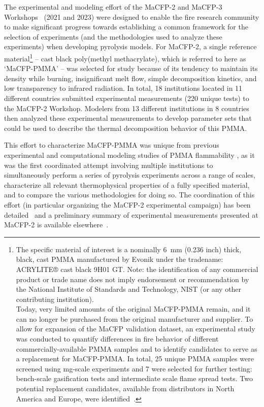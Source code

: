 \documentclass{book}
\begin{document}
The experimental and modeling effort of the MaCFP-2 and MaCFP-3 Workshops~\cite{PreliminarySummary, MaCFP3Proceedings} (2021 and 2023) were designed to enable the fire research community to make significant progress towards establishing a common framework for the selection of experiments (and the methodologies used to analyze these experiments) when developing pyrolysis models. For MaCFP-2, a single reference material\footnote{The specific material of interest is a nominally 6~mm (0.236 inch) thick, black, cast PMMA manufactured by Evonik under the tradename: ACRYLITE® cast black 9H01 GT. Note: the identification of any commercial product or trade name does not imply endorsement or recommendation by the National Institute of Standards and Technology, NIST (or any other contributing institution).\\
Today, very limited amounts of the original MaCFP-PMMA remain, and it can no longer be purchased from the original manufacturer and supplier. To allow for expansion of the MaCFP validation dataset, an experimental study~\cite{DeLannoye2025Evaluating} was conducted to quantify differences in fire behavior of different commercially-available PMMA samples and to identify candidates to serve as a replacement for MaCFP-PMMA. In total, 25 unique PMMA samples were screened using mg-scale experiments and 7 were selected for further testing: bench-scale gasification tests and intermediate scale flame spread tests. Two potential replacement candidates, available from distributors in North America and Europe, were identified~\cite{DeLannoye2025Evaluating}.} -- cast black poly(methyl methacrylate), which is referred to here as `MaCFP-PMMA' -- was selected for study because of its tendency to maintain its density while burning, insignificant melt flow, simple decomposition kinetics, and low transparency to infrared radiation. In total, 18 institutions located in 11 different countries submitted experimental measurements (220 unique tests) to the MaCFP-2 Workshop. Modelers from 13 different institutions in 8 countries then analyzed these experimental measurements to develop parameter sets that could be used to describe the thermal decomposition behavior of this PMMA.

This effort to characterize MaCFP-PMMA was unique from previous experimental \cite{fiola2020comparison,kashiwagi1982study,hirata1985thermal,tewarson1992fire,rhodes1996burning} and computational modeling studies of PMMA flammability \cite{fiola2020comparison,consalvi2008numerical,leventon2015flame,fukumoto2018large}, as it was the first coordinated attempt involving multiple institutions to simultaneously perform a series of pyrolysis experiments across a range of scales, characterize all relevant thermophysical properties of a fully specified material, and to compare the various methodologies for doing so. The coordination of this effort (in particular organizing the MaCFP-2 experimental campaign) has been detailed~\cite{Leventon2022ASTM} and a preliminary summary of experimental measurements presented at MaCFP-2 is available elsewhere~\cite{PreliminarySummary}.
\end{document}
